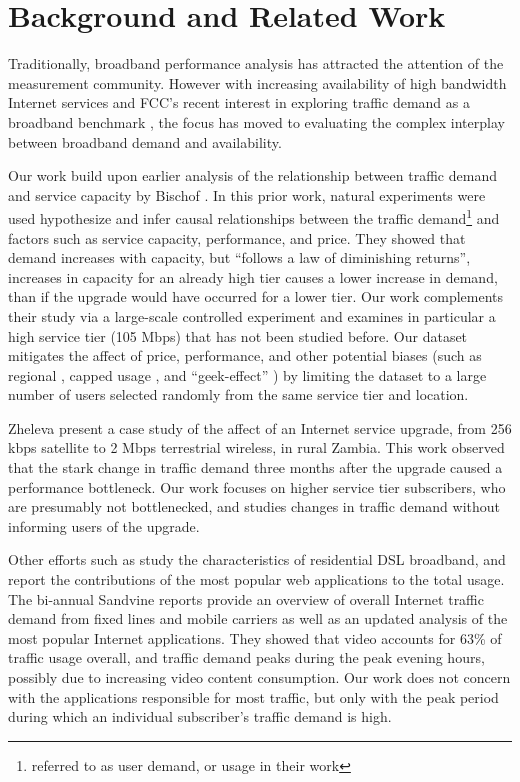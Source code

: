 \section{Background and Related Work}\label{sec:related}

Traditionally, broadband performance analysis has attracted the attention of 
the measurement community. However with increasing availability of high 
bandwidth Internet services and FCC's recent interest in exploring traffic 
demand as a broadband benchmark \cite{fcc2015progress-report}, the focus has 
moved to evaluating the complex interplay between broadband demand and 
availability.

Our work build upon earlier analysis of the relationship between traffic demand 
and service capacity by Bischof \ea \cite{dasu-imc2014}. In this prior work, 
natural experiments were used hypothesize and infer causal relationships between 
the traffic demand\footnote{referred to as user demand, or usage in their work} 
and factors such as service capacity, performance, and price. They showed 
that demand increases with capacity, but ``follows a law of diminishing  
returns'', \ie increases in capacity for an already high tier causes a lower 
increase in demand, than if the upgrade would have occurred for a lower tier. 
Our work complements their study via a large-scale controlled experiment and 
examines in particular a high service tier (105 Mbps) that has not been studied 
before. Our dataset mitigates the affect of price, performance, and other 
potential biases (such as regional \cite{dasu-weather, dasu-region}, capped 
usage \cite{usage-caps}, and ``geek-effect'' \cite{dasu-imc2014}) by limiting 
the dataset to a large number of users selected randomly from the same service 
tier and location.

Zheleva \ea present a case study of the affect of an Internet service 
upgrade, from 256 kbps satellite to 2 Mbps terrestrial wireless, in rural 
Zambia. 
This work observed that the stark change in traffic demand three months after 
the upgrade caused a performance bottleneck. Our work focuses on higher 
service tier subscribers, who are presumably not bottlenecked, and studies 
changes in traffic demand without informing users of the upgrade.

Other efforts such as \cite{imc102-maier} study the characteristics of 
residential DSL broadband, and report the contributions of the most popular 
web applications to the total usage.
The bi-annual Sandvine reports \cite{sandvine2014report1h, 
sandvine2014report2h} provide an overview of overall Internet traffic 
demand from fixed lines and mobile carriers as well as an updated analysis of 
the most popular Internet applications. They showed that video accounts for 63\%
of traffic usage overall, and traffic demand peaks during the peak evening 
hours, possibly due to increasing video content consumption. Our work does not 
concern with the applications responsible for most traffic, but only with the 
peak period during which an individual subscriber's traffic demand is high.


